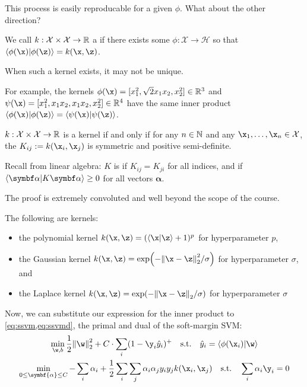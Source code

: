 \documentclass[class=cs480,notes,tikz]{agony}
\begin{document}
This process is easily reproducable for a given $\phi$.
What about the other direction?

\begin{defn}
  We call $k : \mathcal{X} \times \mathcal{X} \to \mathbb{R}$
  a  if there exists some $\phi : \mathcal{X} \to \mathcal{H}$
  so that $\ip{\phi(\x)}{\phi(\z)} = k(\x,\z)$.
\end{defn}

\begin{remark}
  When such a kernel exists, it may not be unique.

  For example, the kernels $\phi(\x) = [x_1^2,\sqrt2 x_1x_2,x_2^2] \in \R^3$
  and $\psi(\x) = [x_1^2,x_1x_2,x_1x_2,x_2^2] \in \R^4$
  have the same inner product $\ip{\phi(\x)}{\phi(\z)} = \ip{\psi(\x)}{\psi(\z)}$.
\end{remark}

\begin{theorem}
  $k : \mathcal{X} \times \mathcal{X} \to \mathbb{R}$ is a kernel if and only if
  for any $n \in \mathbb{N}$ and any $\x_1,\dotsc,\x_n \in \mathcal{X}$,
  the  $K_{ij} := k(\x_i,\x_j)$ is symmetric and positive semi-definite.
\end{theorem}

Recall from linear algebra: $K$ is  if $K_{ij} = K_{ji}$ for all indices,
and  if $\ip{\symbf\alpha}{K\symbf\alpha} \geq 0$ for all vectors $\symbf\alpha$.

The proof is extremely convoluted and well beyond the scope of the course.

\begin{example}
  The following are kernels:
  \begin{itemize}
    \item the polynomial kernel $k(\x,\z) = (\ip{\x}{\z} + 1)^p$ for hyperparameter $p$,
    \item the Gaussian kernel $k(\x,\z) = \exp(-\norm{\x-\z}_2^2/\sigma)$ for hyperparameter $\sigma$, and
    \item the Laplace kernel $k(\x,\z) = \exp(-\norm{\x-\z}_2/\sigma)$ for hyperparameter $\sigma$
  \end{itemize}
\end{example}

Now, we can substitute our expression for the inner product to \cref{eq:ssvm,eq:ssvmd},
the primal and dual of the soft-margin SVM:
\begin{gather*}
  \min_{\w,b} \frac12\norm{\w}_2^2 + C\cdot\sum_i(1-\y_i\hat y_i)^+
  \qq{s.t.} \hat y_i = \ip{\phi(\x_i)}{\w} \\
  \min_{0 \leq \symbf{\alpha} \leq C}
  -\sum_i \alpha_i + \frac12 \sum_i \sum_j \alpha_i \alpha_j y_i y_j k(\x_i,\x_j)
  \qq{s.t.} \sum_i \alpha_i \y_i = 0
\end{gather*}
\end{document}
